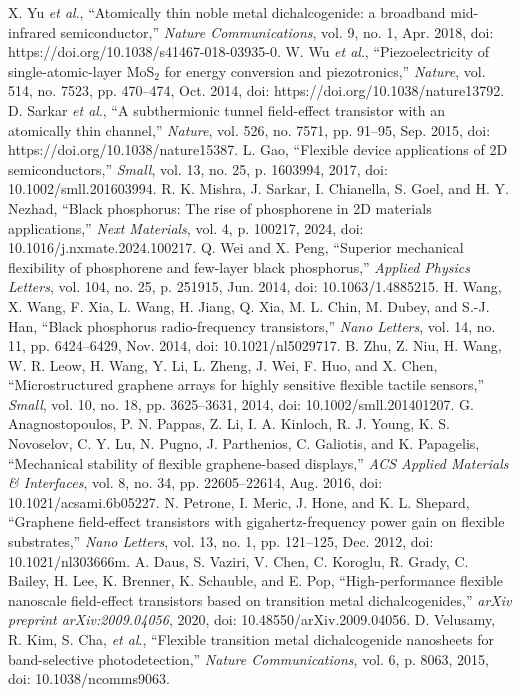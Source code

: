 \documentclass[conference]{IEEEtran}
\begin{document}
\begin{thebibliography}{00}
 X. Yu \textit{et al}., ``Atomically thin noble metal dichalcogenide: a broadband mid-infrared semiconductor,'' \textit{Nature Communications}, vol. 9, no. 1, Apr. 2018, doi: https://doi.org/10.1038/s41467-018-03935-0.
 W. Wu \textit{et al}., ``Piezoelectricity of single-atomic-layer MoS$_2$ for energy conversion and piezotronics,'' \textit{Nature}, vol. 514, no. 7523, pp. 470–474, Oct. 2014, doi: https://doi.org/10.1038/nature13792.
 D. Sarkar \textit{et al}., ``A subthermionic tunnel field-effect transistor with an atomically thin channel,'' \textit{Nature}, vol. 526, no. 7571, pp. 91–95, Sep. 2015, doi: https://doi.org/10.1038/nature15387.
 L. Gao, ``Flexible device applications of 2D semiconductors,'' \textit{Small}, vol. 13, no. 25, p. 1603994, 2017, doi: 10.1002/smll.201603994.
 R. K. Mishra, J. Sarkar, I. Chianella, S. Goel, and H. Y. Nezhad, ``Black phosphorus: The rise of phosphorene in 2D materials applications,'' \textit{Next Materials}, vol. 4, p. 100217, 2024, doi: 10.1016/j.nxmate.2024.100217.
 Q. Wei and X. Peng, ``Superior mechanical flexibility of phosphorene and few-layer black phosphorus,'' \textit{Applied Physics Letters}, vol. 104, no. 25, p. 251915, Jun. 2014, doi: 10.1063/1.4885215.
 H. Wang, X. Wang, F. Xia, L. Wang, H. Jiang, Q. Xia, M. L. Chin, M. Dubey, and S.-J. Han, ``Black phosphorus radio-frequency transistors,'' \textit{Nano Letters}, vol. 14, no. 11, pp. 6424–6429, Nov. 2014, doi: 10.1021/nl5029717.
 B. Zhu, Z. Niu, H. Wang, W. R. Leow, H. Wang, Y. Li, L. Zheng, J. Wei, F. Huo, and X. Chen, ``Microstructured graphene arrays for highly sensitive flexible tactile sensors,'' \textit{Small}, vol. 10, no. 18, pp. 3625–3631, 2014, doi: 10.1002/smll.201401207.
 G. Anagnostopoulos, P. N. Pappas, Z. Li, I. A. Kinloch, R. J. Young, K. S. Novoselov, C. Y. Lu, N. Pugno, J. Parthenios, C. Galiotis, and K. Papagelis, ``Mechanical stability of flexible graphene-based displays,'' \textit{ACS Applied Materials \& Interfaces}, vol. 8, no. 34, pp. 22605–22614, Aug. 2016, doi: 10.1021/acsami.6b05227.
 N. Petrone, I. Meric, J. Hone, and K. L. Shepard, ``Graphene field-effect transistors with gigahertz-frequency power gain on flexible substrates,'' \textit{Nano Letters}, vol. 13, no. 1, pp. 121–125, Dec. 2012, doi: 10.1021/nl303666m.
 A. Daus, S. Vaziri, V. Chen, C. Koroglu, R. Grady, C. Bailey, H. Lee, K. Brenner, K. Schauble, and E. Pop, ``High-performance flexible nanoscale field-effect transistors based on transition metal dichalcogenides,'' \textit{arXiv preprint arXiv:2009.04056}, 2020, doi: 10.48550/arXiv.2009.04056.
 D. Velusamy, R. Kim, S. Cha, \textit{et al}., ``Flexible transition metal dichalcogenide nanosheets for band-selective photodetection,'' \textit{Nature Communications}, vol. 6, p. 8063, 2015, doi: 10.1038/ncomms9063.
\end{thebibliography}
\end{document}

